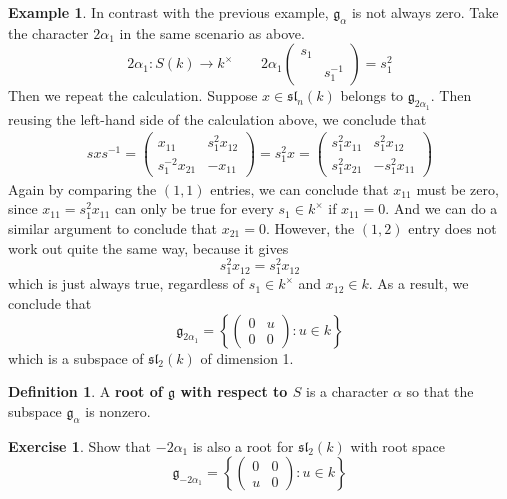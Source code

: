 \documentclass[12pt]{article}
\theoremstyle{definition}
\newtheorem{definition}[theorem]{Definition}
\newtheorem{example}[theorem]{Example}
\newtheorem{exercise}[theorem]{Exercise}
\numberwithin{theorem}{subsection}
\newcommand{\lb}{\left\{}
\newcommand{\rb}{\right\}}
\newcommand{\tbf}{\textbf}
\newcommand{\inv}{^{-1}}
\newcommand{\frakg}{\mathfrak{g}}
\newcommand{\fraksl}{\mathfrak{sl}}
\begin{document}
\begin{example}
In contrast with the previous example, $\frakg_\alpha$ is not always zero. Take the character $2 \alpha_1$ in the same scenario as above.
\[
	2\alpha_1:S(k) \to k^\times \qquad 2\alpha_1\begin{pmatrix}
			s_1 \\
			& s_1 \inv
		\end{pmatrix}
		= s_1^2
\]
Then we repeat the calculation. Suppose $x \in \fraksl_n(k)$ belongs to $\frakg_{2\alpha_1}$. Then reusing the left-hand side of the calculation above, we conclude that
\begin{align*}
	sxs \inv = \begin{pmatrix}
		x_{11} & s_1^2 x_{12} \\
		s_1^{-2} x_{21} & - x_{11}
	\end{pmatrix}
	= s_1^2 x =
	\begin{pmatrix}
		s_1^2 x_{11} &  s_1^2 x_{12} \\
		s_1^2 x_{21} & - s_1^2 x_{11}
	\end{pmatrix} 
\end{align*}
Again by comparing the $(1,1)$ entries, we can conclude that $x_{11}$ must be zero, since $x_{11} = s_1^2 x_{11}$ can only be true for every $s_1 \in k^\times$ if $x_{11} = 0$. And we can do a similar argument to conclude that $x_{21} = 0$. However, the $(1,2)$ entry does not work out quite the same way, because it gives
\[
	s_1^2 x_{12} = s_1^2 x_{12}
\]
which is just always true, regardless of $s_1 \in k^\times$ and $x_{12} \in k$. As a result, we conclude that
\[
	\frakg_{2\alpha_1} =
	\lb
	\begin{pmatrix}
		0 & u \\
		0 & 0 
	\end{pmatrix}
	: u \in k
	\rb
\]
which is a subspace of $\fraksl_{2}(k)$ of dimension 1.
\end{example}

\begin{definition}
A \tbf{root of $\frakg$ with respect to $S$} is a character $\alpha$ so that the subspace $\frakg_\alpha$ is nonzero.
\end{definition}

\begin{exercise}
Show that $-2\alpha_1$ is also a root for $\fraksl_2(k)$ with root space
\[
	\frakg_{-2\alpha_1} =
	\lb
	\begin{pmatrix}
		0 & 0 \\
		u & 0 
	\end{pmatrix}
	: u \in k
	\rb
\]
\end{exercise}
\end{document}

